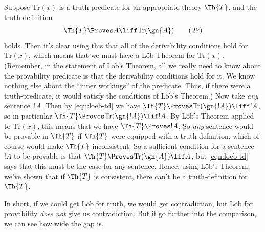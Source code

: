 Suppose $\mathrm{Tr}(x)$ is a truth-predicate for an appropriate
theory $\Th{T}$, and the truth-definition  
\begin{equation}\label{eqn:loeb-td}
\Th{T}\Proves A \liff \mathrm{Tr}(\gn{A})\tag{\textit{Tr}}
\end{equation}
holds. Then it's clear using this that all of the derivability
conditions hold for $\mathrm{Tr}(x)$, which means that we must have a
L\"ob Theorem for $\mathrm{Tr}(x)$. (Remember, in the statement of
L\"ob's Theorem, all we really need to know about the provability
predicate is that the derivability conditions hold for it. We know
nothing else about the ``inner workings'' of the predicate. Thus, if
there were a truth-predicate, it would satisfy the conditions of
L\"ob's Theorem.) Now take \textit{any} sentence~$!A$. Then by
\eqref{eqn:loeb-td} we have $\Th{T} \Proves \mathrm{Tr}(\gn{!A}) \liff
!A$, so in particular $\Th{T} \Proves \mathrm{Tr}(\gn{!A}) \lif !A$.
By L\"ob's Theorem applied to $\mathrm{Tr}(x)$, this means that we
have $\Th{T} \Proves !A$. So \emph{any} sentence would be provable in
$\Th{T}$ if $\Th{T}$ were equipped with a truth-definition, which of
course would make $\Th{T}$ inconsistent. So a sufficient condition for
a sentence~$!A$ to be provable is that $\Th{T} \Proves
\mathrm{Tr}(\gn{A}) \lif A$, but \eqref{eqn:loeb-td} says that this
must be the case for any sentence.
Hence, using L\"ob's Theorem, we've shown that if $\Th{T}$ is
consistent, there can't be a truth-definition for~$\Th{T}$. 

In short, if we could get L\"ob for truth, we would get contradiction,
but L\"ob for provability \emph{does not} give us contradiction. But
if go further into the comparison, we can see  how wide the gap is. 

